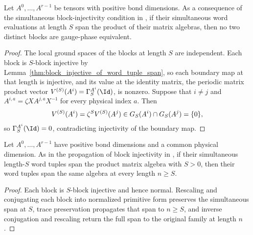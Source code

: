 \begin{lemma}
    \label{thm:block-word-span-separation}
    \leanok
    Let $A^0,\ldots,A^{r-1}$ be tensors with positive bond dimensions. As a
    consequence of the simultaneous block-injectivity condition in
    \cite[Section IV.C]{Cirac2021Matrix}, if their simultaneous word
    evaluations at length $S$ span the product of their matrix algebras, then
    no two distinct blocks are gauge-phase equivalent.
\end{lemma}
\begin{proof}
    \leanok
    The local ground spaces of the blocks at length $S$ are independent. Each
    block is $S$-block injective by
    Lemma~\ref{thm:block_injective_of_word_tuple_span}, so each boundary
    map at that length is injective, and its value at the identity matrix,
    the periodic matrix product vector $V^{(S)}(A^i)=\Gamma^{A^i}_S(\Id)$, is
    nonzero. Suppose that $i\neq j$ and $A^{i,a}=\zeta XA^{j,a}X^{-1}$ for every
    physical index $a$. Then
    \begin{align}
        V^{(S)}(A^i)=\zeta^SV^{(S)}(A^j)\in G_S(A^i)\cap G_S(A^j)=\{0\},\notag
    \end{align}
    so $\Gamma^{A^i}_S(\Id)=0$, contradicting injectivity of the boundary map.
\end{proof}

\begin{lemma}
    \label{thm:block_word_span_propagation}
    \leanok
    Let $A^0,\ldots,A^{r-1}$ have positive bond dimensions and a common
    physical dimension. As in the propagation of block injectivity in
    \cite[Section~IV.C]{Cirac2021Matrix}, if their simultaneous length-$S$
    word tuples span the product matrix algebra with $S>0$, then their word
    tuples span the same algebra at every length $n\geq S$.
\end{lemma}
\begin{proof}
    \leanok
    Each block is $S$-block injective and hence normal. Rescaling and
    conjugating each block into normalized primitive form preserves
    the simultaneous span at $S$, trace preservation propagates that span
    to $n\geq S$, and inverse conjugation and rescaling return the full span
    to the original family at length $n$.
\end{proof}

